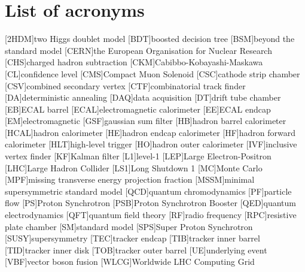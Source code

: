 




\chapter*{List of acronyms}
\begin{acronym}
[2HDM]{two Higgs doublet model}
[BDT]{boosted decision tree}
[BSM]{beyond the standard model}
[CERN]{the European Organisation for Nuclear Research }
[CHS]{charged hadron subtraction}
[CKM]{Cabibbo-Kobayashi-Maskawa}
[CL]{confidence level}
[CMS]{Compact Muon Solenoid}
[CSC]{cathode strip chamber}
[CSV]{combined secondary vertex}
[CTF]{combinatorial track finder}
[DA]{deterministic annealing}
[DAQ]{data acquisition}
[DT]{drift tube chamber}
[EB]{ECAL barrel}
[ECAL]{electromagnetic calorimeter}
[EE]{ECAL endcap}
[EM]{electromagnetic}
[GSF]{gaussian sum filter}
[HB]{hadron barrel calorimeter}
[HCAL]{hadron calorimeter}
[HE]{hadron endcap calorimeter}
[HF]{hadron forward calorimeter}
[HLT]{high-level trigger}
[HO]{hadron outer calorimeter}
[IVF]{inclusive vertex finder}
[KF]{Kalman filter}
[L1]{level-1}
[LEP]{Large Electron-Positron}
[LHC]{Large Hadron Collider}
[LS1]{Long Shutdown 1}
[MC]{Monte Carlo}
[MPF]{missing transverse energy projection fraction}
[MSSM]{minimal supersymmetric standard model}
[QCD]{quantum chromodynamics}
[PF]{particle flow}
[PS]{Proton Synchrotron}
[PSB]{Proton Synchrotron Booster}
[QED]{quantum electrodynamics}
[QFT]{quantum field theory}
[RF]{radio frequency}
[RPC]{resistive plate chamber}
[SM]{standard model}
[SPS]{Super Proton Synchrotron}
[SUSY]{supersymmetry}
[TEC]{tracker endcap}
[TIB]{tracker inner barrel}
[TID]{tracker inner disk}
[TOB]{tracker outer barrel}
[UE]{underlying event}
[VBF]{vector boson fusion}
[WLCG]{Worldwide LHC Computing Grid}
\end{acronym}

